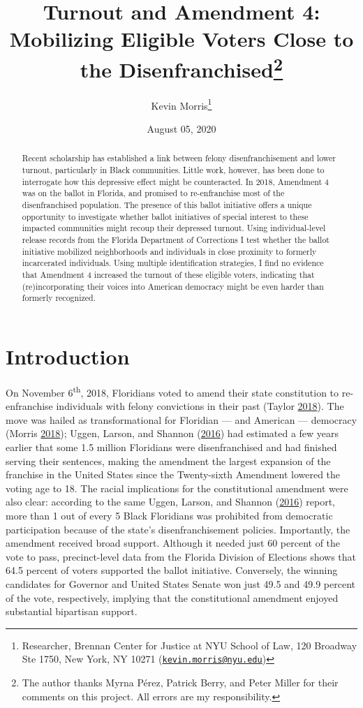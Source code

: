 \documentclass[
  12pt,
]{article}
\title{Turnout and Amendment 4: Mobilizing Eligible Voters Close to the Disenfranchised\thanks{The author thanks Myrna Pérez, Patrick Berry, and Peter Miller for their comments on this project. All errors are my responsibility.}}
\author{Kevin Morris\footnote{Researcher, Brennan Center for Justice at NYU School of Law, 120 Broadway Ste 1750, New York, NY 10271 (\href{mailto:kevin.morris@nyu.edu}{\nolinkurl{kevin.morris@nyu.edu}})}}
\date{August 05, 2020}
\begin{document}
\maketitle
\begin{abstract}
Recent scholarship has established a link between felony disenfranchisement and lower turnout, particularly in Black communities. Little work, however, has been done to interrogate how this depressive effect might be counteracted. In 2018, Amendment 4 was on the ballot in Florida, and promised to re-enfranchise most of the disenfranchised population. The presence of this ballot initiative offers a unique opportunity to investigate whether ballot initiatives of special interest to these impacted communities might recoup their depressed turnout. Using individual-level release records from the Florida Department of Corrections I test whether the ballot initiative mobilized neighborhoods and individuals in close proximity to formerly incarcerated individuals. Using multiple identification strategies, I find no evidence that Amendment 4 increased the turnout of these eligible voters, indicating that (re)incorporating their voices into American democracy might be even harder than formerly recognized.
\end{abstract}

\pagebreak

\doublespacing

\hypertarget{introduction}{%
\section*{Introduction}\label{introduction}}

On November 6\textsuperscript{th}, 2018, Floridians voted to amend their state constitution to re-enfranchise individuals with felony convictions in their past (Taylor \protect\hyperlink{ref-Taylor2018}{2018}). The move was hailed as transformational for Floridian --- and American --- democracy (Morris \protect\hyperlink{ref-Morris2018}{2018}); Uggen, Larson, and Shannon (\protect\hyperlink{ref-sentencing_2016}{2016}) had estimated a few years earlier that some 1.5 million Floridians were disenfranchised and had finished serving their sentences, making the amendment the largest expansion of the franchise in the United States since the Twenty-sixth Amendment lowered the voting age to 18. The racial implications for the constitutional amendment were also clear: according to the same Uggen, Larson, and Shannon (\protect\hyperlink{ref-sentencing_2016}{2016}) report, more than 1 out of every 5 Black Floridians was prohibited from democratic participation because of the state's disenfranchisement policies. Importantly, the amendment received broad support. Although it needed just 60 percent of the vote to pass, precinct-level data from the Florida Division of Elections shows that 64.5 percent of voters supported the ballot initiative. Conversely, the winning candidates for Governor and United States Senate won just 49.5 and 49.9 percent of the vote, respectively, implying that the constitutional amendment enjoyed substantial bipartisan support.
\end{document}
